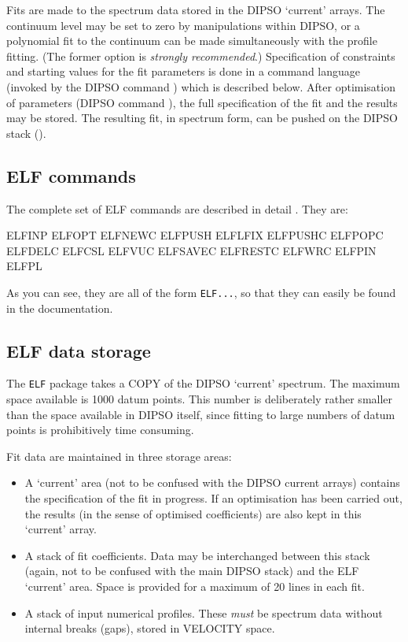 \documentclass[twoside,11pt,noabs,nolof]{starlink}
\begin{document}
Fits are made to the spectrum data stored in the DIPSO `current'
arrays. The continuum level may be set to zero by manipulations within
DIPSO, or a polynomial fit to the continuum can be made simultaneously
with the profile fitting. (The former option is \emph{strongly
recommended}.) Specification of constraints and starting values for
the fit parameters is done in a command language (invoked by the DIPSO
command )  which is described below. After optimisation of
parameters (DIPSO command ),  the full specification of the
fit and the results may be stored. The resulting fit, in spectrum
form, can be pushed on the DIPSO stack ().

\subsection {ELF commands}

The complete set of ELF commands are described in detail
. They are:

\begin{terminalv}
ELFINP   ELFOPT   ELFNEWC
ELFPUSH  ELFLFIX
ELFPUSHC ELFPOPC  ELFDELC ELFCSL ELFVUC
ELFSAVEC ELFRESTC ELFWRC
ELFPIN   ELFPL
\end{terminalv}

As you can see, they are all of the form {\texttt{ELF...}},  so that they can
easily be found in the documentation.

\subsection {ELF data storage}

The {\texttt{ELF}}  package takes a COPY of the DIPSO `current' spectrum.
The maximum space available is 1000 datum points.
This number is deliberately rather smaller than the space available in DIPSO
itself, since fitting to large numbers of datum points is prohibitively time
consuming.

Fit data are maintained in three storage areas:

\begin{itemize}

\item A `current' area (not to be confused with the DIPSO current
arrays) contains the specification of the fit in progress. If an
optimisation has been carried out, the results (in the sense of
optimised coefficients) are also kept in this `current' array.

\item A stack of fit coefficients. Data may be interchanged between
this stack (again, not to be confused with the main DIPSO stack) and
the ELF `current' area. Space is provided for a maximum of 20 lines in
each fit.

\item A stack of input numerical profiles. These \emph{must} be
spectrum data without internal breaks (gaps), stored in VELOCITY
space.

\end{itemize}
\end{document}
